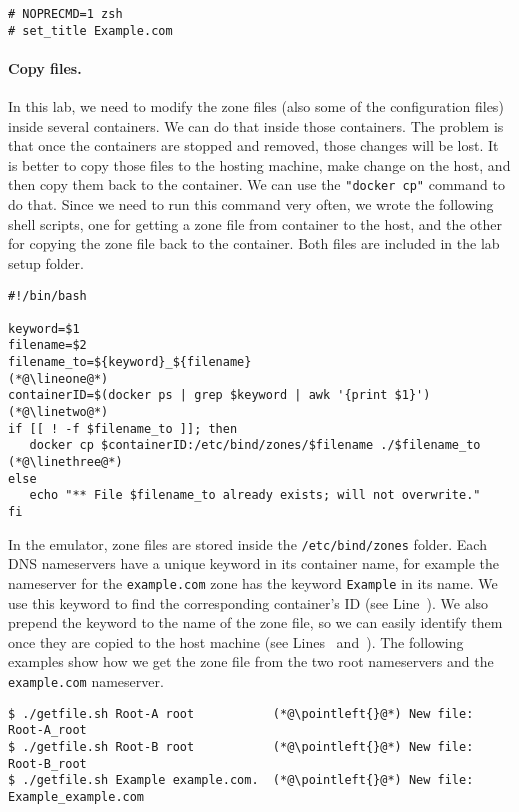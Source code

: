 \begin{lstlisting}
# NOPRECMD=1 zsh
# set_title Example.com
\end{lstlisting}
 

\paragraph{Copy files.} In this lab, we need to modify the zone files (also
some of the configuration files) inside several containers. We can do that
inside those containers. The problem is that once the containers are stopped
and removed, those changes will be lost. It is better to copy those files
to the hosting machine, make change on the host, and then copy them 
back to the container.  We can use the \texttt{"docker cp"} command
to do that. Since we need to run this command very often, we wrote 
the following shell scripts, one for getting a zone file from container
to the host, and the other for copying the zone file back 
to the container. Both files are included in the lab setup folder.

\begin{lstlisting}[caption=Getting the zone file from container: \texttt{getzone.sh}]
#!/bin/bash

keyword=$1
filename=$2
filename_to=${keyword}_${filename}                                  (*@\lineone@*)
containerID=$(docker ps | grep $keyword | awk '{print $1}')         (*@\linetwo@*) 
if [[ ! -f $filename_to ]]; then
   docker cp $containerID:/etc/bind/zones/$filename ./$filename_to  (*@\linethree@*) 
else
   echo "** File $filename_to already exists; will not overwrite."
fi
\end{lstlisting}

In the emulator, zone files are stored inside the \texttt{/etc/bind/zones} folder.  
Each DNS nameservers have a unique keyword in its container name, for example
the nameserver for the \texttt{example.com} zone has the keyword \texttt{Example}
in its name. We use this keyword to find the corresponding container's ID (see
Line~\linetwo). We also prepend the keyword to the name of the zone file, so we can
easily identify them once they are copied to the host machine (see Lines~\lineone
and~\linethree). The following examples show how we get the zone file from
the two root nameservers and the \texttt{example.com} nameserver.  


\begin{lstlisting}
$ ./getfile.sh Root-A root           (*@\pointleft{}@*) New file: Root-A_root
$ ./getfile.sh Root-B root           (*@\pointleft{}@*) New file: Root-B_root
$ ./getfile.sh Example example.com.  (*@\pointleft{}@*) New file: Example_example.com
\end{lstlisting}
 

